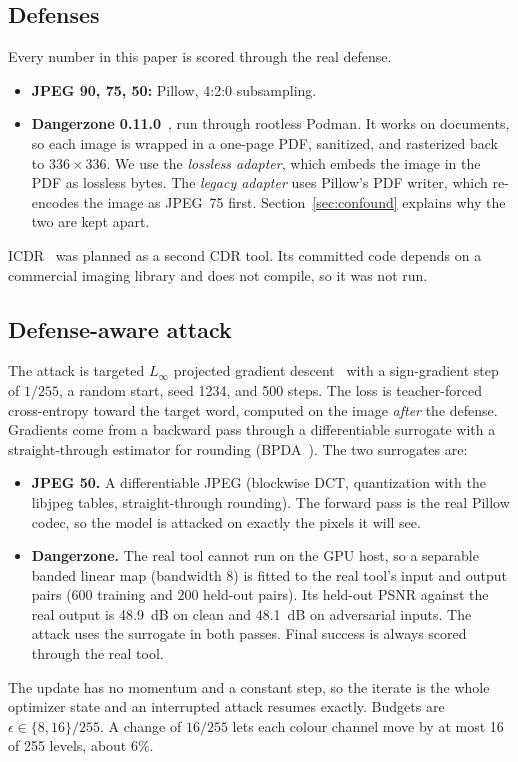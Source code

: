 \documentclass[11pt]{article}
\begin{document}
\subsection{Defenses}
Every number in this paper is scored through the real defense.
\begin{itemize}
\item \textbf{JPEG 90, 75, 50:} Pillow, 4:2:0 subsampling.
\item \textbf{Dangerzone 0.11.0}~\cite{dangerzone}, run through rootless Podman. It works
on documents, so each image is wrapped in a one-page PDF, sanitized, and rasterized back
to $336\times336$. We use the \emph{lossless adapter}, which embeds the image in the PDF as
lossless bytes. The \emph{legacy adapter} uses Pillow's PDF writer, which re-encodes the
image as JPEG~75 first. Section~\ref{sec:confound} explains why the two are kept apart.
\end{itemize}
ICDR~\cite{icdr,openimagecdr} was planned as a second CDR tool. Its committed code depends
on a commercial imaging library and does not compile, so it was not run.

\subsection{Defense-aware attack}
The attack is targeted $L_\infty$ projected gradient descent~\cite{madry2018pgd} with a
sign-gradient step of $1/255$, a random start, seed 1234, and 500 steps. The loss is
teacher-forced cross-entropy toward the target word, computed on the image \emph{after}
the defense. Gradients come from a backward pass through a differentiable surrogate with a
straight-through estimator for rounding (BPDA~\cite{athalye2018obfuscated}). The two
surrogates are:
\begin{itemize}
\item \textbf{JPEG 50.} A differentiable JPEG (blockwise DCT, quantization with the libjpeg
tables, straight-through rounding). The forward pass is the real Pillow codec, so the model
is attacked on exactly the pixels it will see.
\item \textbf{Dangerzone.} The real tool cannot run on the GPU host, so a separable banded
linear map (bandwidth 8) is fitted to the real tool's input and output pairs (600 training and
200 held-out pairs). Its held-out PSNR against the real output is 48.9~dB on clean and
48.1~dB on adversarial inputs. The attack uses the surrogate in both passes. Final success
is always scored through the real tool.
\end{itemize}
The update has no momentum and a constant step, so the iterate is the whole optimizer state
and an interrupted attack resumes exactly. Budgets are $\epsilon\in\{8,16\}/255$. A change of
$16/255$ lets each colour channel move by at most 16 of 255 levels, about 6\%.
\end{document}
